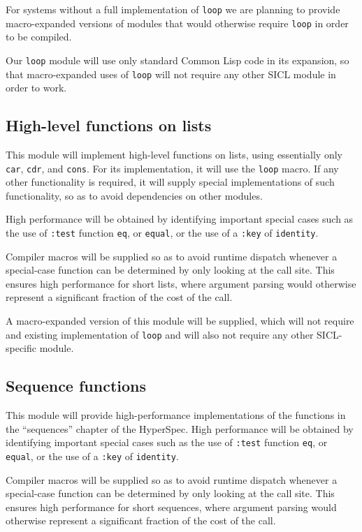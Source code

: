 \documentclass{article}
\def\sysname{SICL}
\begin{document}
For systems without a full implementation of \texttt{loop} we are
planning to provide macro-expanded versions of modules that would
otherwise require \texttt{loop} in order to be compiled. 

Our \texttt{loop} module will use only standard Common Lisp code in
its expansion, so that macro-expanded uses of \texttt{loop} will not
require any other \sysname{} module in order to work.  

\subsection{High-level functions on lists}

This module will implement high-level functions on lists, using
essentially only \texttt{car}, \texttt{cdr}, and \texttt{cons}.  For
its implementation, it will use the \texttt{loop} macro.  If any
other functionality is required, it will supply special
implementations of such functionality, so as to avoid dependencies on
other modules. 

High performance will be obtained by identifying important special
cases such as the use of \texttt{:test} function \texttt{eq}, or
\texttt{equal}, or the use of a \texttt{:key} of \texttt{identity}.

Compiler macros will be supplied so as to avoid runtime dispatch
whenever a special-case function can be determined by only looking at
the call site.  This ensures high performance for short lists, where
argument parsing would otherwise represent a significant fraction of
the cost of the call.

A macro-expanded version of this module will be supplied, which will
not require and existing implementation of \texttt{loop} and will also
not require any other \sysname{}-specific module. 

\subsection{Sequence functions}

This module will provide high-performance implementations of the
functions in the ``sequences'' chapter of the HyperSpec.  High
performance will be obtained by identifying important special cases
such as the use of \texttt{:test} function \texttt{eq}, or
\texttt{equal}, or the use of a \texttt{:key} of \texttt{identity}. 

Compiler macros will be supplied so as to avoid runtime dispatch
whenever a special-case function can be determined by only looking at
the call site.  This ensures high performance for short sequences,
where argument parsing would otherwise represent a significant
fraction of the cost of the call.
\end{document}
